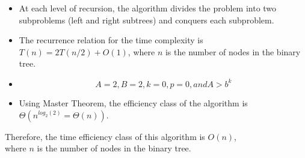 \documentclass{article}
\begin{document}
\begin{itemize}
    \item At each level of recursion, the algorithm divides the problem into two subproblems (left and right subtrees) and conquers each subproblem.
    \item The recurrence relation for the time complexity is \(T(n) = 2T(n/2) + O(1)\), where \(n\) is the number of nodes in the binary tree.
    \item \[ A = 2, B = 2, k = 0, p = 0, and A > b^{k}\]
    \item Using Master Theorem, the efficiency class of the algorithm is \(\Theta(n^{log_2(2)} = \Theta(n))\).
\end{itemize}
Therefore, the time efficiency class of this algorithm is \(O(n)\),
\\where \(n\) is the number of nodes in the binary tree.
\newpage
\end{document}
